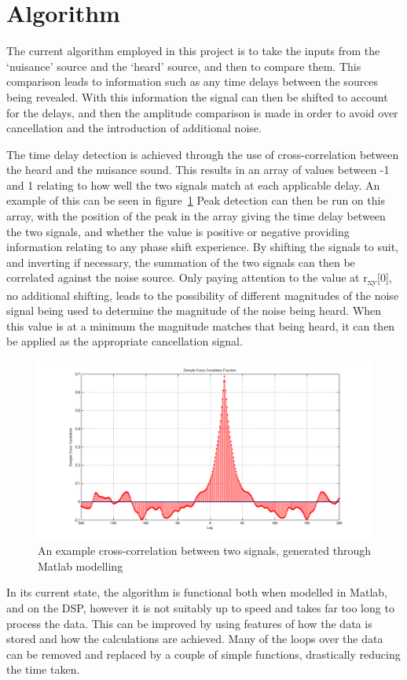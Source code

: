 \section{Algorithm}
The current algorithm employed in this project is to take the inputs from the `nuisance' source and the `heard' source, and then to compare them.
This comparison leads to information such as any time delays between the sources being revealed.
With this information the signal can then be shifted to account for the delays, and then the amplitude comparison is made in order to avoid over cancellation and the introduction of additional noise.

The time delay detection is achieved through the use of cross-correlation between the heard and the nuisance sound.
This results in an array of values between -1 and 1 relating to how well the two signals match at each applicable delay.
An example of this can be seen in figure~\ref{fig:crosscorr}
Peak detection can then be run on this array, with the position of the peak in the array giving the time delay between the two signals, and whether the value is positive or negative providing information relating to any phase shift experience.
By shifting the signals to suit, and inverting if necessary, the summation of the two signals can then be correlated against the noise source.
Only paying attention to the value at r\textsubscript{xy}[0], no additional shifting, leads to the possibility of different magnitudes of the noise signal being used to determine the magnitude of the noise being heard.
When this value is at a minimum the magnitude matches that being heard, it can then be applied as the appropriate cancellation signal.


\begin{figure}[H]
	\centering
	\includegraphics[width=\textwidth]{./img/crosscorr.png}
	\caption{An example cross-correlation between two signals, generated through Matlab modelling}
	\label{fig:crosscorr}
\end{figure}


In its current state, the algorithm is functional both when modelled in Matlab, and on the DSP, however it is not suitably up to speed and takes far too long to process the data.
This can be improved by using features of how the data is stored and how the calculations are achieved.
Many of the loops over the data can be removed and replaced by a couple of simple functions, drastically reducing the time taken.
